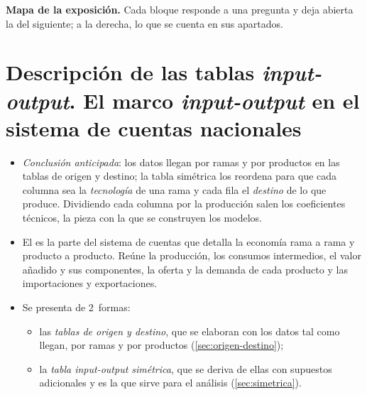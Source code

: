 \documentclass[11pt]{article}
\begin{document}
\begin{anotaciones}
\textbf{Mapa de la exposición.} Cada bloque responde a una pregunta y deja abierta la del siguiente; a la derecha, lo que se cuenta en sus apartados.
\begin{infografiacaja}
\caption{Mapa de la exposición: la pregunta de cada bloque y el hilo que los une}\label{figu:mapa-tema}
\end{infografiacaja}
\end{anotaciones}



\section{Descripción de las tablas \emph{input-output}.\cortetitulo{} El marco \emph{input-output} en el sistema de cuentas nacionales}\label{sec:descripcion}

\begin{itemize}
\item \emph{Conclusión anticipada}: los datos llegan por ramas y por productos en las tablas de origen y destino; la tabla simétrica los reordena para que cada columna sea la \emph{tecnología} de una rama y cada fila el \emph{destino} de lo que produce. Dividiendo cada columna por la producción salen los coeficientes técnicos, la pieza con la que se construyen los modelos.
\item El  es la parte del sistema de cuentas que detalla la economía rama a rama y producto a producto. Reúne la producción, los consumos intermedios, el valor añadido y sus componentes, la oferta y la demanda de cada producto y las importaciones y exportaciones\nocite{Eurostat2013SEC2010}.
\item Se presenta de 2~formas:
  \begin{itemize}
  \item las \emph{tablas de origen y destino}, que se elaboran con los datos tal como llegan, por ramas y por productos (\ref{sec:origen-destino});
  \item la \emph{tabla \emph{input-output} simétrica}, que se deriva de ellas con supuestos adicionales y es la que sirve para el análisis (\ref{sec:simetrica}).
  \end{itemize}
\end{itemize}
\end{document}
